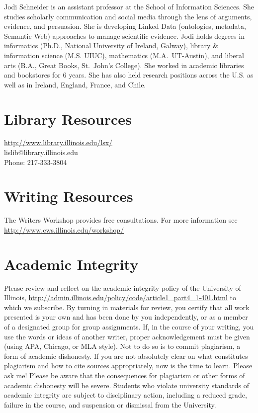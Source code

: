 \documentclass[]{article}
\begin{document}
Jodi Schneider is an assistant professor at the School of Information
Sciences. She studies scholarly communication and social media through
the lens of arguments, evidence, and persuasion. She is developing
Linked Data (ontologies, metadata, Semantic Web) approaches to manage
scientific evidence. Jodi holds degrees in informatics (Ph.D., National
University of Ireland, Galway), library \& information science (M.S.
UIUC), mathematics (M.A.~UT-Austin), and liberal arts (B.A., Great
Books, St.~John's College). She worked in academic libraries and
bookstores for 6 years. She has also held research positions across the
U.S. as well as in Ireland, England, France, and Chile.

\section{Library Resources}\label{library-resources}

\url{http://www.library.illinois.edu/lsx/}\\
lislib@library.illinois.edu\\
Phone: 217-333-3804

\section{Writing Resources}\label{writing-resources}

The Writers Workshop provides free consultations. For more information
see \url{http://www.cws.illinois.edu/workshop/}

\section{Academic Integrity}\label{academic-integrity}

Please review and reflect on the academic integrity policy of the
University of Illinois,
\url{http://admin.illinois.edu/policy/code/article1_part4_1-401.html} to
which we subscribe. By turning in materials for review, you certify that
all work presented is your own and has been done by you independently,
or as a member of a designated group for group assignments. If, in the
course of your writing, you use the words or ideas of another writer,
proper acknowledgement must be given (using APA, Chicago, or MLA style).
Not to do so is to commit plagiarism, a form of academic dishonesty. If
you are not absolutely clear on what constitutes plagiarism and how to
cite sources appropriately, now is the time to learn. Please ask me!
Please be aware that the consequences for plagiarism or other forms of
academic dishonesty will be severe. Students who violate university
standards of academic integrity are subject to disciplinary action,
including a reduced grade, failure in the course, and suspension or
dismissal from the University.
\end{document}
